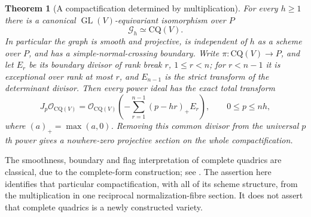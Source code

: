 \documentclass[11pt,reqno]{amsart}
\numberwithin{equation}{section}
\newtheorem{theorem}{Theorem}[section]
\theoremstyle{definition}\newtheorem{definition}[theorem]{Definition}
\theoremstyle{remark}\newtheorem{remark}[theorem]{Remark}
\newcommand{\OO}{\mathcal O}\newcommand{\II}{\mathcal I}
\begin{document}
\begin{theorem}[A compactification determined by multiplication]
\label{thm:power-graph-v157}
For every $h\geq1$ there is a canonical $\operatorname{GL}(V)$-equivariant
isomorphism over $P$
\begin{equation}\label{eq:power-graph-CQ-v157}
                      \mathcal G_h\simeq\mathrm{CQ}(V).
\end{equation}
In particular the graph is smooth and projective, is independent of
$h$ as a scheme over $P$, and has a simple-normal-crossing boundary.
Write $\pi:\mathrm{CQ}(V)\to P$, and let $E_r$ be its boundary divisor
of rank break $r$, $1\leq r<n$; for $r<n-1$ it is exceptional over
rank at most $r$, and $E_{n-1}$ is the strict transform of the determinant
divisor. Then every power ideal has the exact total transform
\begin{equation}\label{eq:power-boundary-v157}
 J_p\OO_{\mathrm{CQ}(V)}=
 \OO_{\mathrm{CQ}(V)}\left(-\sum_{r=1}^{n-1}(p-hr)_+E_r\right),
                    \qquad 0\leq p\leq nh,
\end{equation}
where $(a)_+=\max(a,0)$. Removing this common divisor from the universal
$p$th power gives a nowhere-zero projective section on the whole
compactification.
\end{theorem}

The smoothness, boundary and flag interpretation of complete quadrics
are classical, due to the complete-form construction; see
\cite{Vainsencher1982,Massarenti2020}. The assertion here identifies
that particular compactification, with all of its scheme structure,
from the multiplication in one reciprocal normalization-fibre section.
It does not assert that complete quadrics is a newly constructed variety.
\end{document}
